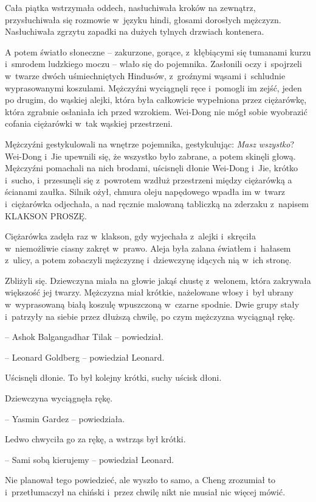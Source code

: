 \documentclass[oneside,polish,11pt,rmheadings]{mwbk}
\begin{document}
Cała piątka wstrzymała oddech, nasłuchiwała kroków na zewnątrz, przysłuchiwała się rozmowie w~języku hindi, głosami dorosłych mężczyzn. Nasłuchiwała zgrzytu zapadki na dużych tylnych drzwiach kontenera.

A potem światło słoneczne -- zakurzone, gorące, z~kłębiącymi się tumanami kurzu i~smrodem ludzkiego moczu -- wlało się do pojemnika. Zasłonili oczy i~spojrzeli w~twarze dwóch uśmiechniętych Hindusów, z~groźnymi wąsami i~schludnie wyprasowanymi koszulami. Mężczyźni wyciągnęli ręce i~pomogli im zejść, jeden po drugim, do wąskiej alejki, która była całkowicie wypełniona przez ciężarówkę, która zgrabnie osłaniała ich przed wzrokiem. Wei-Dong nie mógł sobie wyobrazić cofania ciężarówki w~tak wąskiej przestrzeni.

Mężczyźni gestykulowali na wnętrze pojemnika, gestykulując: \textit{Masz wszystko}? Wei-Dong i~Jie upewnili się, że wszystko było zabrane, a potem skinęli głową. Mężczyźni pomachali na nich brodami, uścisnęli dłonie Wei-Dong i~Jie, krótko i~sucho, i~przesunęli się z~powrotem wzdłuż przestrzeni między ciężarówką a ścianami zaułka. Silnik ożył, chmura oleju napędowego wpadła im w~twarz i~ciężarówka odjechała, a nad ręcznie malowaną tabliczką na zderzaku z~napisem KLAKSON PROSZĘ.

Ciężarówka zadęła raz w~klakson, gdy wyjechała z~alejki i~skręciła w~niemożliwie ciasny zakręt w~prawo. Aleja była zalana światłem i~hałasem z~ulicy, a potem zobaczyli mężczyznę i~dziewczynę idących nią w~ich stronę.

Zbliżyli się. Dziewczyna miała na głowie jakąś chustę z~welonem, która zakrywała większość jej twarzy. Mężczyzna miał krótkie, nażelowane włosy i~był ubrany w~wyprasowaną białą koszulę wpuszczoną w~czarne spodnie. Dwie grupy stały i~patrzyły na siebie przez dłuższą chwilę, po czym mężczyzna wyciągnął rękę.

-- Ashok Balgangadhar Tilak -- powiedział.

-- Leonard Goldberg -- powiedział Leonard. 

Uścisnęli dłonie. To był kolejny krótki, suchy uścisk dłoni.

Dziewczyna wyciągnęła rękę. 

-- Yasmin Gardez -- powiedziała.

Ledwo chwyciła go za rękę, a wstrząs był krótki.

-- Sami sobą kierujemy -- powiedział Leonard. 

Nie planował tego powiedzieć, ale wyszło to samo, a Cheng zrozumiał to i~przetłumaczył na chiński i~przez chwilę nikt nie musiał nic więcej mówić.
\end{document}
